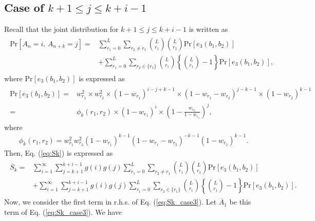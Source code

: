 \documentclass[dvipdfmx,english]{ampmt} %
\begin{document}
\subsection{Case of $k+1 \leq j \leq k+i-1$}
Recall that the joint distribution for $k+1 \leq j \leq k+i-1$ is written as
\begin{align}\begin{split}
	\mathrm{Pr}[A_n=i,\, A_{n+k}=j] 
	=& \sum_{r_1=0}^{L} \sum_{r_2 \neq r_1} \binom{L}{r_1}\binom{L}{r_2}\mathrm{Pr}[e_3(b_1,b_2)] \\
	&+ \sum_{r_1=0}^{L} \sum_{r_2 \in \{r_1\}} \binom{L}{r_1}\left\{\binom{L}{r_1}-1\right\}\mathrm{Pr}[e_3(b_1,b_2)],
\end{split}\end{align}
where $\mathrm{Pr}[e_3(b_1,b_2)]$ is expressed as
\begin{align}\begin{split}
	\mathrm{Pr}[e_3(b_1,b_2)]
  =& w_{r_1}^2  \times w_{r_2}^2 
  \times (1-w_{r_1})^{i-j+k-1} 
  \times (1-w_{r_1}-w_{r_2})^{j-k-1}
  \times (1-w_{r_2})^{k-1} \\
  =&\phi_k(r_1,r_2)\times (1-w_{r_1})^{i} \times \left(1-\frac{w_{r_2}}{1-w_{r_1}} \right)^{j},
\end{split}\end{align}
%
where
\begin{align}\label{eq:phi_k}
	\phi_k(r_1,r_2) = w_{r_1}^2 w_{r_2}^2 
  	(1-w_{r_1})^{k-1} 
  	(1-w_{r_1}-w_{r_2})^{-k-1}
  	(1-w_{r_2})^{k-1}.
\end{align}
%
Then, Eq. (\ref{eq:Sk}) is expressed as
\begin{align}\begin{split}\label{eq:Sk_case3}
	\overline{S}_k 
	=& \sum_{i=1}^{\infty}\sum_{j=k+1}^{k+i-1} g(i)g(j) \sum_{r_1=0}^{L} \sum_{r_2 \neq r_1} \binom{L}{r_1}\binom{L}{r_2}\mathrm{Pr}[e_3(b_1,b_2)]\\ 
	&+ \sum_{i=1}^{\infty}\sum_{j=k+1}^{k+i-1} g(i)g(j) \sum_{r_1=0}^{L} \sum_{r_2 \in \{r_1\}} \binom{L}{r_1} \left\{\binom{L}{r_1}-1 \right\}\mathrm{Pr}[e_3(b_1,b_2)].
\end{split}\end{align}
%
Now, we consider the first term in r.h.s. of Eq. (\ref{eq:Sk_case3}). Let $\overline{A}_1$ be this term of Eq. (\ref{eq:Sk_case3}). We have
\end{document}
